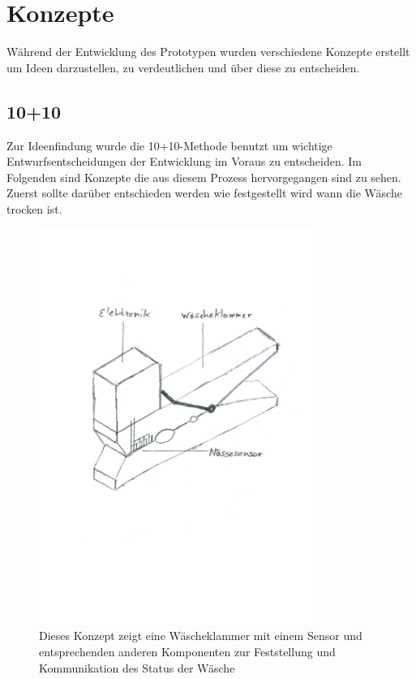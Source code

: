 \section{Konzepte}
Während der Entwicklung des Prototypen wurden verschiedene Konzepte erstellt um Ideen darzustellen, zu  verdeutlichen und über diese zu entscheiden.
\subsection{10+10}
Zur Ideenfindung wurde die 10+10-Methode benutzt um wichtige Entwurfsentscheidungen der Entwicklung im Voraus zu entscheiden. Im Folgenden sind Konzepte die aus diesem Prozess hervorgegangen sind zu sehen. Zuerst sollte darüber entschieden werden wie festgestellt wird wann die Wäsche trocken ist. 
\begin{figure}[htb] 
	\centerline{\includegraphics*[width=0.8\textwidth]{./10+10/Concept/01-klammer}}
	\caption{Dieses Konzept zeigt eine Wäscheklammer mit einem Sensor und entsprechenden anderen Komponenten zur Feststellung und Kommunikation des Status der Wäsche} 
	\label{10+10_klammer}
\end{figure}
